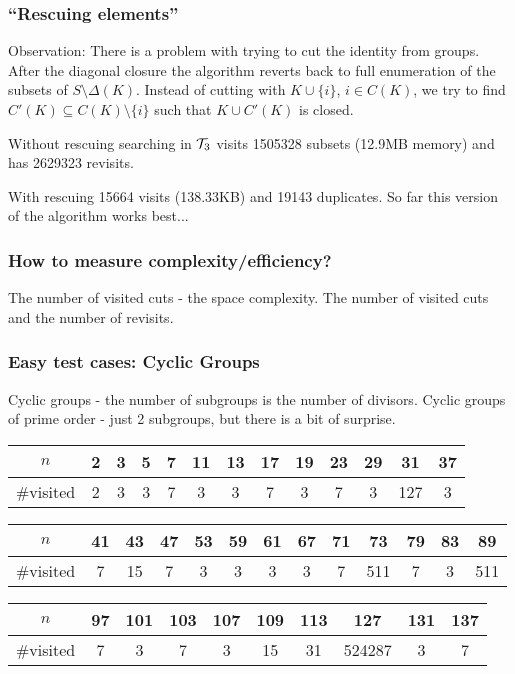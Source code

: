 \documentclass{beamer}
\newcommand{\cT}{{\cal T}}
\newcommand{\jump}{\vskip6pt}
\begin{document}
\begin{frame}\frametitle{``Rescuing elements''}
Observation: There is a problem with trying to cut the identity from groups. After the diagonal closure the algorithm reverts back to full enumeration of the subsets of $S\setminus \Delta(K)$.
\jump
Instead of cutting with $K\cup\{i\}$, $i\in C(K)$, we try to find $C'(K)\subseteq C(K)\setminus \{i\}$ such that $K\cup C'(K)$ is closed.

\jump
Without rescuing searching in $\cT_3$ visits 1505328 subsets (12.9MB memory) and has 2629323 revisits.

With rescuing 15664 visits (138.33KB) and 19143 duplicates.  
\jump
So far this version of the algorithm works best...
\end{frame}

\begin{frame}\frametitle{How to measure complexity/efficiency?}
The number of visited cuts - the space complexity.
\jump
The number of visited cuts and the number of revisits.
\end{frame}


\begin{frame}\frametitle{Easy test cases: Cyclic Groups}

Cyclic groups - the number of subgroups is the number of divisors.
\jump
Cyclic groups of prime order - just 2 subgroups, but there is a bit of surprise.
\begin{tabular}{c|c|c|c|c|c|c|c|c|c|c|c|c|}
$n$ & 2 & 3 & 5 & 7 & 11 & 13 & 17 & 19 & 23 & 29 & 31 & 37  \\
\hline
\#visited & 2 & 3&  3& 7& 3& 3& 7& 3& 7& 3& 127 & 3 
\end{tabular}
\jump
\begin{tabular}{c|c|c|c|c|c|c|c|c|c|c|c|c|}
$n$ & 41 & 43 & 47 & 53 & 59 & 61 & 67 & 71 & 73 & 79 & 83 & 89  \\
\hline
\#visited & 7 & 15 &  7& 3& 3& 3& 3& 7& 511& 7& 3 & 511 
\end{tabular}
\jump
\begin{tabular}{c|c|c|c|c|c|c|c|c|c|}
$n$ & 97 & 101 & 103 & 107 & 109 & 113 & 127 & 131 & 137   \\
\hline
\#visited & 7 & 3 &  7& 3& 15 & 31 & 524287 & 3& 7
\end{tabular}


\end{frame}
\end{document}
